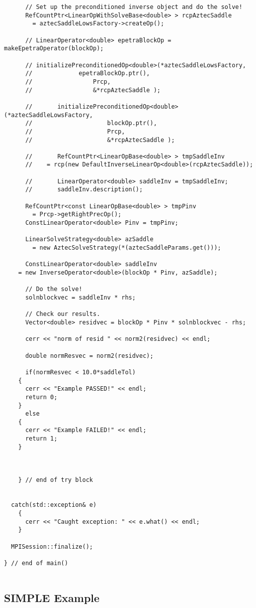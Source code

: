 \begin{verbatim}
      // Set up the preconditioned inverse object and do the solve!
      RefCountPtr<LinearOpWithSolveBase<double> > rcpAztecSaddle 
        = aztecSaddleLowsFactory->createOp();

      // LinearOperator<double> epetraBlockOp = makeEpetraOperator(blockOp);

      // initializePreconditionedOp<double>(*aztecSaddleLowsFactory, 
      //			 epetraBlockOp.ptr(), 
      //				 Prcp,
      //				 &*rcpAztecSaddle );

      //       initializePreconditionedOp<double>(*aztecSaddleLowsFactory, 
      // 					 blockOp.ptr(), 
      // 					 Prcp,
      // 					 &*rcpAztecSaddle );
      
      //       RefCountPtr<LinearOpBase<double> > tmpSaddleInv 
      // 	= rcp(new DefaultInverseLinearOp<double>(rcpAztecSaddle));
      
      //       LinearOperator<double> saddleInv = tmpSaddleInv;
      //       saddleInv.description();

      RefCountPtr<const LinearOpBase<double> > tmpPinv 
        = Prcp->getRightPrecOp();
      ConstLinearOperator<double> Pinv = tmpPinv;

      LinearSolveStrategy<double> azSaddle 
        = new AztecSolveStrategy(*(aztecSaddleParams.get()));

      ConstLinearOperator<double> saddleInv 
	= new InverseOperator<double>(blockOp * Pinv, azSaddle);

      // Do the solve!
      solnblockvec = saddleInv * rhs;

      // Check our results.
      Vector<double> residvec = blockOp * Pinv * solnblockvec - rhs;

      cerr << "norm of resid " << norm2(residvec) << endl;
      
      double normResvec = norm2(residvec);

      if(normResvec < 10.0*saddleTol)
	{
	  cerr << "Example PASSED!" << endl;
	  return 0;
	}
      else
	{
	  cerr << "Example FAILED!" << endl;
	  return 1;
	}



    } // end of try block


  catch(std::exception& e)
    {
      cerr << "Caught exception: " << e.what() << endl;
    }

  MPISession::finalize();

} // end of main()


\end{verbatim}



\subsection{SIMPLE Example}
